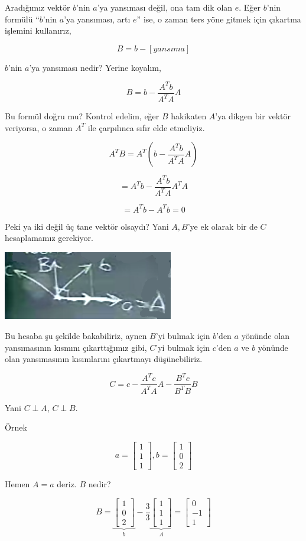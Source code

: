 \documentclass[12pt,fleqn]{article}\usepackage{../../common}
\begin{document}
Aradığımız vektör $b$'nin $a$'ya yansıması değil, ona tam dik olan
$e$. Eğer $b$'nin formülü ``$b$'nin $a$'ya yansıması, artı $e$'' ise, o
zaman ters yöne gitmek için çıkartma işlemini kullanırız,

$$B = b - [yansıma]$$

$b$'nin $a$'ya yansıması nedir? Yerine koyalım,

$$B = b - \frac{ A^Tb}{A^TA}A$$

Bu formül doğru mu? Kontrol edelim, eğer $B$ hakikaten $A$'ya dikgen bir
vektör veriyorsa, o zaman $A^T$ ile çarpılınca sıfır elde etmeliyiz. 

$$A^TB = A^T(b - \frac{ A^Tb}{A^TA}A)$$

$$= A^Tb - \frac{ A^Tb}{A^TA}A^TA$$

$$= A^Tb - A^Tb = 0$$

Peki ya iki değil üç tane vektör olsaydı? Yani $A,B$'ye ek olarak bir de
$C$ hesaplamamız gerekiyor. 

\includegraphics[height=3cm]{17_3.png}

Bu hesaba şu şekilde bakabiliriz, aynen $B$'yi bulmak için $b$'den $a$ yönünde
olan yansımasının kısmını çıkarttığımız gibi, $C$'yi bulmak için $c$'den $a$ ve
$b$ yönünde olan yansımasının kısımlarını çıkartmayı düşünebiliriz.

$$C = c - \frac{ A^Tc}{A^TA}A - \frac{ B^Tc}{B^TB}B$$

Yani $C \perp A$, $C \perp B$. 

Örnek

$$
a = 
\left[\begin{array}{r}
1 \\ 1 \\ 1
\end{array}\right],
b = 
\left[\begin{array}{r}
1 \\ 0 \\ 2
\end{array}\right]
$$

Hemen $A = a$ deriz. $B$ nedir?

$$
B = 
\underbrace{
\left[\begin{array}{r}
1 \\ 0 \\ 2
\end{array}\right]}_{b}
-
\frac{ 3}{3}
\underbrace{
\left[\begin{array}{r}
1 \\ 1 \\ 1
\end{array}\right]}_{A}
=
\left[\begin{array}{r}
0 \\ -1 \\ 1
\end{array}\right]
$$
\end{document}
